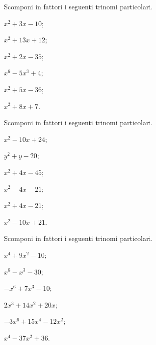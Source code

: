 \begin{esercizio}
 \label{ese:17.4}
 Scomponi in fattori i seguenti trinomi particolari.
 \begin{multicols}{3}
 \begin{enumeratea}
 \item $x^{2}+3x-10$;
 \item $x^{2}+13x+12$;
 \item $x^{2}+2x-35$;
 \item $x^{6}-5x^{3}+4$;
 \item $x^{2}+5x-36$;
 \item $x^{2}+8x+7$.
 \end{enumeratea}
\end{multicols}
\end{esercizio}

\begin{esercizio}
 \label{ese:17.5}
 Scomponi in fattori i seguenti trinomi particolari.
 \begin{multicols}{3}
 \begin{enumeratea}
 \item $x^{2}-10x+24$;
 \item $y^{2}+y-20$;
 \item $x^{2}+4x-45$;
 \item $x^{2}-4x-21$;
 \item $x^{2}+4x-21$;
 \item $x^{2}-10x+21$.
 \end{enumeratea}
\end{multicols}
\end{esercizio}

\begin{esercizio}
 \label{ese:17.6}
 Scomponi in fattori i seguenti trinomi particolari.
 \begin{multicols}{3}
 \begin{enumeratea}
 \item $x^{4}+9x^{2}-10$;
 \item $x^{6}-x^{3}-30$;
 \item $-x^{6}+7x^{3}-10$;
 \item $2x^{3}+14x^{2}+20x$;
 \item $-3x^{6}+15x^{4}-12x^{2}$;
 \item $x^{4}-37x^{2}+36$.
 \end{enumeratea}
\end{multicols}
\end{esercizio}

